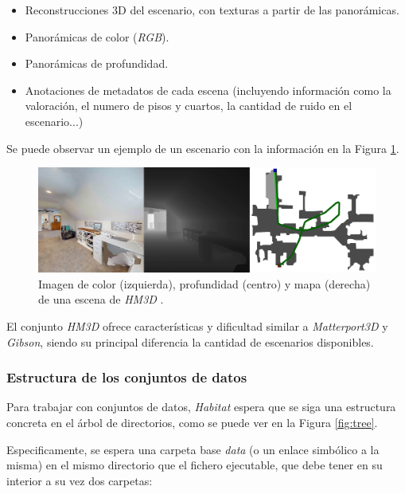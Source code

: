 \begin{itemize}
	\begin{itemize}
		\item Reconstrucciones 3D del escenario, con texturas a partir de las panorámicas.
		\item Panorámicas de color (\textit{RGB}).
		\item Panorámicas de profundidad.
		\item Anotaciones de metadatos de cada escena (incluyendo información como la valoración, el numero de pisos y cuartos, la cantidad de ruido en el escenario...)
	\end{itemize}
	
	Se puede observar un ejemplo de un escenario con la información en la Figura \ref{fig:chap4-hm3d}.	
	
	\begin{figure}[h]
    \centering
    \includegraphics[width=\textwidth]{imagenes/cap4/hm3d.png}
    \caption{Imagen de color (izquierda), profundidad (centro) y mapa (derecha) de una escena de \textit{HM3D} \cite{habitatmp3d}.}
    \label{fig:chap4-hm3d}
\end{figure}	
\end{itemize}

El conjunto \textit{HM3D} ofrece características y dificultad similar a \textit{Matterport3D} y \textit{Gibson}, siendo su principal diferencia la cantidad de escenarios disponibles.

\subsubsection{Estructura de los conjuntos de datos}

Para trabajar con conjuntos de datos, \textit{Habitat} espera que se siga una estructura concreta en el árbol de directorios, como se puede ver en la Figura \ref{fig:tree}.

Especificamente, se espera una carpeta base \textit{data} (o un enlace simbólico a la misma) en el mismo directorio que el fichero ejecutable, que debe tener en su interior a su vez dos carpetas:


